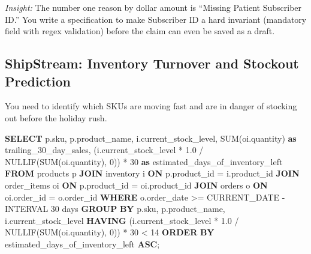 \documentclass[
  11pt,
  openany,
  oneside]{book}
\newenvironment{Shaded}{}{}
\newcommand{\DataTypeTok}[1]{\textcolor[rgb]{0.56,0.13,0.00}{#1}}
\newcommand{\DecValTok}[1]{\textcolor[rgb]{0.25,0.63,0.44}{#1}}
\newcommand{\FloatTok}[1]{\textcolor[rgb]{0.25,0.63,0.44}{#1}}
\newcommand{\FunctionTok}[1]{\textcolor[rgb]{0.02,0.16,0.49}{#1}}
\newcommand{\KeywordTok}[1]{\textcolor[rgb]{0.00,0.44,0.13}{\textbf{#1}}}
\newcommand{\NormalTok}[1]{#1}
\newcommand{\OperatorTok}[1]{\textcolor[rgb]{0.40,0.40,0.40}{#1}}
\newcommand{\StringTok}[1]{\textcolor[rgb]{0.25,0.44,0.63}{#1}}
\begin{document}
\emph{Insight:} The number one reason by dollar amount is ``Missing
Patient Subscriber ID.'' You write a specification to make Subscriber ID
a hard invariant (mandatory field with regex validation) before the
claim can even be saved as a draft.

\subsection{ShipStream: Inventory Turnover and Stockout
Prediction}\label{shipstream-inventory-turnover-and-stockout-prediction}

You need to identify which SKUs are moving fast and are in danger of
stocking out before the holiday rush.

\begin{Shaded}
\begin{Highlighting}[]
\KeywordTok{SELECT} 
\NormalTok{    p.sku,}
\NormalTok{    p.product\_name,}
\NormalTok{    i.current\_stock\_level,}
    \FunctionTok{SUM}\NormalTok{(oi.quantity) }\KeywordTok{as}\NormalTok{ trailing\_30\_day\_sales,}
\NormalTok{    (i.current\_stock\_level }\OperatorTok{*} \FloatTok{1.0} \OperatorTok{/} \FunctionTok{NULLIF}\NormalTok{(}\FunctionTok{SUM}\NormalTok{(oi.quantity), }\DecValTok{0}\NormalTok{)) }\OperatorTok{*} \DecValTok{30} \KeywordTok{as}\NormalTok{ estimated\_days\_of\_inventory\_left}
\KeywordTok{FROM}\NormalTok{ products p}
\KeywordTok{JOIN}\NormalTok{ inventory i }\KeywordTok{ON}\NormalTok{ p.product\_id }\OperatorTok{=}\NormalTok{ i.product\_id}
\KeywordTok{JOIN}\NormalTok{ order\_items oi }\KeywordTok{ON}\NormalTok{ p.product\_id }\OperatorTok{=}\NormalTok{ oi.product\_id}
\KeywordTok{JOIN}\NormalTok{ orders o }\KeywordTok{ON}\NormalTok{ oi.order\_id }\OperatorTok{=}\NormalTok{ o.order\_id}
\KeywordTok{WHERE}\NormalTok{ o.order\_date }\OperatorTok{\textgreater{}=} \FunctionTok{CURRENT\_DATE} \OperatorTok{{-}} \DataTypeTok{INTERVAL} \StringTok{\textquotesingle{}30 days\textquotesingle{}}
\KeywordTok{GROUP} \KeywordTok{BY}\NormalTok{ p.sku, p.product\_name, i.current\_stock\_level}
\KeywordTok{HAVING}\NormalTok{ (i.current\_stock\_level }\OperatorTok{*} \FloatTok{1.0} \OperatorTok{/} \FunctionTok{NULLIF}\NormalTok{(}\FunctionTok{SUM}\NormalTok{(oi.quantity), }\DecValTok{0}\NormalTok{)) }\OperatorTok{*} \DecValTok{30} \OperatorTok{\textless{}} \DecValTok{14}
\KeywordTok{ORDER} \KeywordTok{BY}\NormalTok{ estimated\_days\_of\_inventory\_left }\KeywordTok{ASC}\NormalTok{;}
\end{Highlighting}
\end{Shaded}
\end{document}
